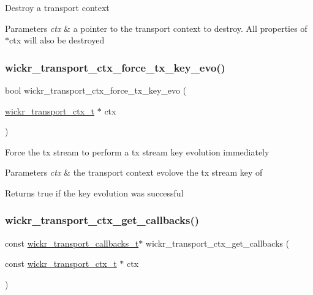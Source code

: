 Destroy a transport context


\begin{DoxyParams}{Parameters}
{\em ctx} & a pointer to the transport context to destroy. All properties of \textquotesingle{}$\ast$ctx\textquotesingle{} will also be destroyed \\
\hline
\end{DoxyParams}
\mbox{\label{group__wickr__transport__ctx_ga177b8b150fe250cf04f8350be94af7fa}} 
\subsubsection{\texorpdfstring{wickr\_transport\_ctx\_force\_tx\_key\_evo()}{wickr\_transport\_ctx\_force\_tx\_key\_evo()}}
{\footnotesize\ttfamily bool wickr\+\_\+transport\+\_\+ctx\+\_\+force\+\_\+tx\+\_\+key\+\_\+evo (\begin{DoxyParamCaption}\item[{\mbox{\hyperlink{structwickr__transport__ctx}{wickr\+\_\+transport\+\_\+ctx\+\_\+t}} $\ast$}]{ctx }\end{DoxyParamCaption})}

Force the tx stream to perform a tx stream key evolution immediately


\begin{DoxyParams}{Parameters}
{\em ctx} & the transport context evolove the tx stream key of \\
\hline
\end{DoxyParams}
\begin{DoxyReturn}{Returns}
true if the key evolution was successful 
\end{DoxyReturn}
\mbox{\label{group__wickr__transport__ctx_gafc6235ed4ee84ccbdfc3a0a0a617b557}} 
\subsubsection{\texorpdfstring{wickr\_transport\_ctx\_get\_callbacks()}{wickr\_transport\_ctx\_get\_callbacks()}}
{\footnotesize\ttfamily const \mbox{\hyperlink{structwickr__transport__callbacks}{wickr\+\_\+transport\+\_\+callbacks\+\_\+t}}$\ast$ wickr\+\_\+transport\+\_\+ctx\+\_\+get\+\_\+callbacks (\begin{DoxyParamCaption}\item[{const \mbox{\hyperlink{structwickr__transport__ctx}{wickr\+\_\+transport\+\_\+ctx\+\_\+t}} $\ast$}]{ctx }\end{DoxyParamCaption})}

